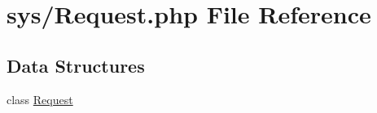 \hypertarget{_request_8php}{}\section{sys/\+Request.php File Reference}
\label{_request_8php}
\subsection*{Data Structures}
\begin{DoxyCompactItemize}
\item 
class \hyperlink{class_request}{Request}
\end{DoxyCompactItemize}
